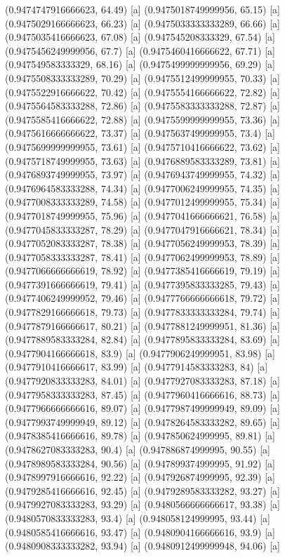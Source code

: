 {{{(0.9474747916666623, 64.49) [a] 
(0.9475018749999956, 65.15) [a] 
(0.9475029166666623, 66.23) [a] 
(0.9475033333333289, 66.66) [a] 
(0.9475035416666623, 67.08) [a] 
(0.947545208333329, 67.54) [a] 
(0.9475456249999956, 67.7) [a] 
(0.9475460416666622, 67.71) [a] 
(0.947549583333329, 68.16) [a] 
(0.9475499999999956, 69.29) [a] 
(0.9475508333333289, 70.29) [a] 
(0.9475512499999955, 70.33) [a] 
(0.9475522916666622, 70.42) [a] 
(0.9475554166666622, 72.82) [a] 
(0.9475564583333288, 72.86) [a] 
(0.9475583333333288, 72.87) [a] 
(0.9475585416666622, 72.88) [a] 
(0.9475599999999955, 73.36) [a] 
(0.9475616666666622, 73.37) [a] 
(0.9475637499999955, 73.4) [a] 
(0.9475699999999955, 73.61) [a] 
(0.9475710416666622, 73.62) [a] 
(0.9475718749999955, 73.63) [a] 
(0.9476889583333289, 73.81) [a] 
(0.9476893749999955, 73.97) [a] 
(0.9476943749999955, 74.32) [a] 
(0.9476964583333288, 74.34) [a] 
(0.9477006249999955, 74.35) [a] 
(0.9477008333333289, 74.58) [a] 
(0.9477012499999955, 75.34) [a] 
(0.9477018749999955, 75.96) [a] 
(0.9477041666666621, 76.58) [a] 
(0.9477045833333287, 78.29) [a] 
(0.9477047916666621, 78.34) [a] 
(0.9477052083333287, 78.38) [a] 
(0.9477056249999953, 78.39) [a] 
(0.9477058333333287, 78.41) [a] 
(0.9477062499999953, 78.89) [a] 
(0.9477066666666619, 78.92) [a] 
(0.9477385416666619, 79.19) [a] 
(0.9477391666666619, 79.41) [a] 
(0.9477395833333285, 79.43) [a] 
(0.9477406249999952, 79.46) [a] 
(0.9477766666666618, 79.72) [a] 
(0.9477829166666618, 79.73) [a] 
(0.9477833333333284, 79.74) [a] 
(0.9477879166666617, 80.21) [a] 
(0.9477881249999951, 81.36) [a] 
(0.9477889583333284, 82.84) [a] 
(0.9477895833333284, 83.69) [a] 
(0.9477904166666618, 83.9) [a] 
(0.9477906249999951, 83.98) [a] 
(0.9477910416666617, 83.99) [a] 
(0.9477914583333283, 84) [a] 
(0.9477920833333283, 84.01) [a] 
(0.9477927083333283, 87.18) [a] 
(0.9477958333333283, 87.45) [a] 
(0.9477960416666616, 88.73) [a] 
(0.9477966666666616, 89.07) [a] 
(0.9477987499999949, 89.09) [a] 
(0.9477993749999949, 89.12) [a] 
(0.9478264583333282, 89.65) [a] 
(0.9478385416666616, 89.78) [a] 
(0.947850624999995, 89.81) [a] 
(0.9478627083333283, 90.4) [a] 
(0.947886874999995, 90.55) [a] 
(0.9478989583333284, 90.56) [a] 
(0.947899374999995, 91.92) [a] 
(0.9478997916666616, 92.22) [a] 
(0.947926874999995, 92.39) [a] 
(0.9479285416666616, 92.45) [a] 
(0.9479289583333282, 93.27) [a] 
(0.9479927083333283, 93.29) [a] 
(0.9480566666666617, 93.38) [a] 
(0.9480570833333283, 93.4) [a] 
(0.948058124999995, 93.44) [a] 
(0.9480585416666616, 93.47) [a] 
(0.9480904166666616, 93.9) [a] 
(0.9480908333333282, 93.94) [a] 
(0.9480912499999948, 94.06) [a] 
}}}

